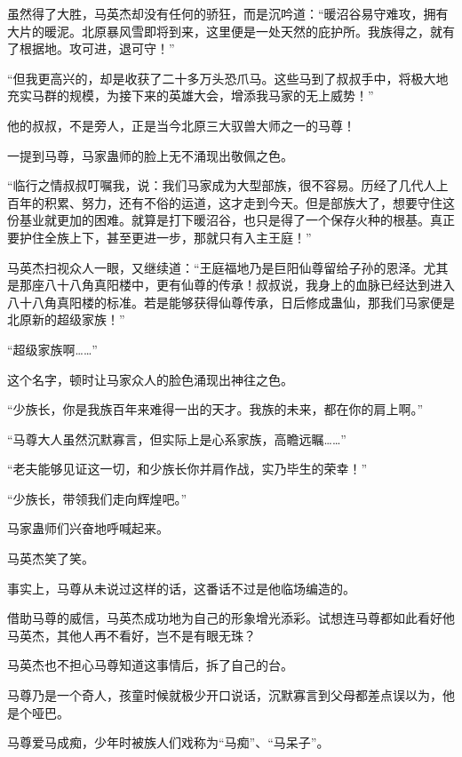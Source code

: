 
\begin{this_body}



虽然得了大胜，马英杰却没有任何的骄狂，而是沉吟道：“暖沼谷易守难攻，拥有大片的暖泥。北原暴风雪即将到来，这里便是一处天然的庇护所。我族得之，就有了根据地。攻可进，退可守！”

“但我更高兴的，却是收获了二十多万头恐爪马。这些马到了叔叔手中，将极大地充实马群的规模，为接下来的英雄大会，增添我马家的无上威势！”

他的叔叔，不是旁人，正是当今北原三大驭兽大师之一的马尊！

一提到马尊，马家蛊师的脸上无不涌现出敬佩之色。

“临行之情叔叔叮嘱我，说：我们马家成为大型部族，很不容易。历经了几代人上百年的积累、努力，还有不俗的运道，这才走到今天。但是部族大了，想要守住这份基业就更加的困难。就算是打下暖沼谷，也只是得了一个保存火种的根基。真正要护住全族上下，甚至更进一步，那就只有入主王庭！”

马英杰扫视众人一眼，又继续道：“王庭福地乃是巨阳仙尊留给子孙的恩泽。尤其是那座八十八角真阳楼中，更有仙尊的传承！叔叔说，我身上的血脉已经达到进入八十八角真阳楼的标准。若是能够获得仙尊传承，日后修成蛊仙，那我们马家便是北原新的超级家族！”

“超级家族啊……”

这个名字，顿时让马家众人的脸色涌现出神往之色。

“少族长，你是我族百年来难得一出的天才。我族的未来，都在你的肩上啊。”

“马尊大人虽然沉默寡言，但实际上是心系家族，高瞻远瞩……”

“老夫能够见证这一切，和少族长你并肩作战，实乃毕生的荣幸！”

“少族长，带领我们走向辉煌吧。”

马家蛊师们兴奋地呼喊起来。

马英杰笑了笑。

事实上，马尊从未说过这样的话，这番话不过是他临场编造的。

借助马尊的威信，马英杰成功地为自己的形象增光添彩。试想连马尊都如此看好他马英杰，其他人再不看好，岂不是有眼无珠？

马英杰也不担心马尊知道这事情后，拆了自己的台。

马尊乃是一个奇人，孩童时候就极少开口说话，沉默寡言到父母都差点误以为，他是个哑巴。

马尊爱马成痴，少年时被族人们戏称为“马痴”、“马呆子”。


\end{this_body}
